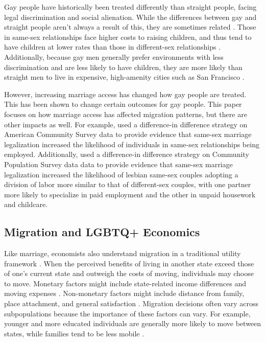 \documentclass[12pt,letterpaper]{article}
\begin{document}
Gay people have historically been treated differently than straight people, facing legal discrimination and social alienation. While the differences between gay and straight people aren’t always a result of this, they are sometimes related \citep{2}. Those in same-sex relationships face higher costs to raising children, and thus tend to have children at lower rates than those in different-sex relationships \citep{8, 10, 11}. Additionally, because gay men generally prefer environments with less discrimination and are less likely to have children, they are more likely than straight men to live in expensive, high-amenity cities such as San Francisco \citep{7, 10, 11, 13}.

However, increasing marriage access has changed how gay people are treated. This has been shown to change certain outcomes for gay people. This paper focuses on how marriage access has affected migration patterns, but there are other impacts as well. For example, \citet{3} used a difference-in difference strategy on American Community Survey data to provide evidence that same-sex marriage legalization increased the likelihood of individuals in same-sex relationships being employed. Additionally, \citet{30} used a difference-in difference strategy on Community Population Survey data data to provide evidence that same-sex marriage legalization increased the likelihood of lesbian same-sex couples adopting a division of labor more similar to that of different-sex couples, with one partner more likely to specialize in paid employment and the other in unpaid housework and childcare. 

\subsection{Migration and LGBTQ+ Economics}
Like marriage, economists also understand migration in a traditional utility framework \citep{12, 8}. When the perceived benefits of living in another state exceed those of one’s current state and outweigh the costs of moving, individuals may choose to move. Monetary factors might include state-related income differences and moving expenses \citep{1, 15, 16, 17}. Non-monetary factors might include distance from family, place attachment, and general satisfaction \citep{1, 15}. Migration decisions often vary across subpopulations because the importance of these factors can vary. For example, younger and more educated individuals are generally more likely to move between states, while families tend to be less mobile \citep{16, 17}. 
\end{document}
